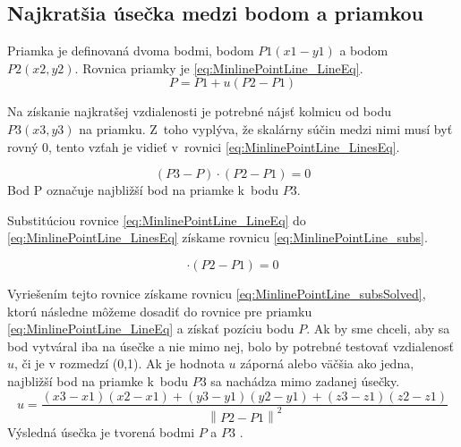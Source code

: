 \subsection*{Najkratšia úsečka medzi bodom a priamkou}\label{sec:najkratsiauseckaBP}
Priamka je definovaná dvoma bodmi, bodom $P1(x1-y1)$ a bodom $P2(x2,y2)$. 
Rovnica priamky je \ref{eq:MinlinePointLine_LineEq}.
\begin{equation}
    P = P1 + u(P2-P1)
    \label{eq:MinlinePointLine_LineEq}
\end{equation}

Na získanie najkratšej vzdialenosti je potrebné nájsť kolmicu od bodu $P3(x3,y3)$ na priamku. Z~toho vyplýva, že skalárny súčin medzi nimi musí byť rovný 0, tento vzťah je vidieť v~rovnici \ref{eq:MinlinePointLine_LinesEq}.

\begin{equation}
    (P3-P)\cdot(P2-P1) =0 
    \label{eq:MinlinePointLine_LinesEq}
\end{equation}
Bod P označuje najbližší bod na priamke k~bodu $P3$.

Substitúciou rovnice \ref{eq:MinlinePointLine_LineEq} do \ref{eq:MinlinePointLine_LinesEq} získame rovnicu \ref{eq:MinlinePointLine_subs}.

\begin{equation}
[P3 - P1 - u(P2-P1)] \cdot (P2 - P1) = 0
    \label{eq:MinlinePointLine_subs}
\end{equation}

Vyriešením tejto rovnice získame rovnicu \ref{eq:MinlinePointLine_subsSolved}, ktorú následne môžeme dosadiť do rovnice pre priamku \ref{eq:MinlinePointLine_LineEq} a získať pozíciu bodu $P$. Ak by sme chceli, aby sa bod vytváral iba na úsečke a nie mimo nej, bolo by potrebné testovať vzdialenosť $u$, či je v rozmedzí (0,1). Ak je hodnota $u$ záporná alebo väčšia ako jedna,  najbližší bod na priamke k~bodu $P3$ sa nachádza mimo zadanej úsečky. 
\begin{equation}
u= \frac
{\left (x3 -x1  \right )\left (x2-x1  \right )
+\left (y3-y1  \right )\left (y2-y1  \right )
+\left (z3-z1  \right )\left (z2-z1  \right )}
{\left \| P2-P1 \right \|^{2}}
    \label{eq:MinlinePointLine_subsSolved}
\end{equation}
Výsledná úsečka je tvorená bodmi $P$ a $P3$ \cite{bourke_Point_Line_Plane}.



